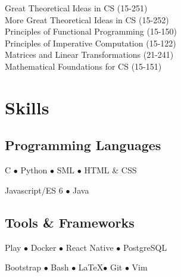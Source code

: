 \documentclass[]{openfont}
\begin{document}
\begin{minipage}[t]{0.40\textwidth}
Great Theoretical Ideas in CS (15-251) \\
More Great Theoretical Ideas in CS (15-252) \\
Principles of Functional Programming (15-150) \\

Principles of Imperative Computation (15-122) \\
Matrices and Linear Transformations (21-241) \\
Mathematical Foundations for CS (15-151)
\sectionsep


\section{Skills}
\subsection{Programming Languages}
\vspace{\topsep}
C \(\bullet\)
Python \(\bullet\)
SML \(\bullet\)
HTML \& CSS

Javascript/ES 6 \(\bullet\)
Java

\sectionsep

\subsection{Tools \& Frameworks}
\vspace{\topsep}
Play \(\bullet\)
Docker \(\bullet\)
React Native \(\bullet\)
PostgreSQL

Bootstrap \(\bullet\)
Bash \(\bullet\)
\LaTeX \(\bullet\)
Git \(\bullet\)
Vim
\sectionsep

%
%

\end{minipage} 
\hfill
\end{document}
